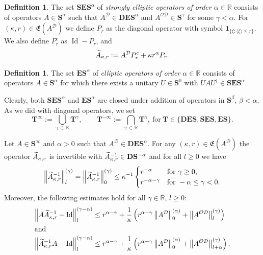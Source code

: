 \documentclass[10pt]{amsart}
\theoremstyle{definition}\newtheorem{defi}[theo]{Definition}\newtheorem{rema}[theo]{Remark}\newtheorem{exam}[theo]{Example}\newtheorem{nota}[theo]{Notation}
\DeclareMathOperator{\Id}{Id}
\newcommand{\R}{\mathbb R}
\newcommand{\CD}{\mathcal{D}}
\newcommand{\CO}{\mathcal{O}}
\newcommand{\bone}{\boldsymbol 1}
\newcommand{\BD}{\mathbf D}
\newcommand{\BE}{\mathbf E}
\newcommand{\BS}{\mathbf S}
\newcommand{\BT}{\mathbf T}
\newcommand{\FE}{\mathfrak{E}}
\newcommand{\snorm}[3]{\left\| #1\right\|_{#3}^{(#2)}}
\newcommand{\ang}[1]{\langle #1 \rangle}
\newcommand{\er}{r}
\let\oldtilde\tilde
\renewcommand*{\tilde}[1]{\mathchoice{\widetilde{#1}}{\widetilde{#1}}{\oldtilde{#1}}{\oldtilde{#1}}}
\begin{document}
\begin{defi}\label{def:ES}
The set $\BS\BE\BS^\alpha$ of \emph{strongly elliptic operators of order $\alpha\in\R$} consists of operators $A\in\BS^\alpha$ such that $A^\CD \in \BD\BE\BS^\alpha$ and $A^{\CO\CD} \in
\BS^\gamma$ for some $\gamma < \alpha$. For $(\kappa,\er)\in \FE(A^\CD)$ we define $P_\er$ as the diagonal operator with symbol $\bone_{\{\xi: \ang{\xi}\leq
\er\}}$. We also define $P_\er^c$ as $\Id - P_\er$, and
\begin{equation}\label{eq:tilde A}
\tilde A_{\kappa,\er} := A^\CD P_\er^c + \kappa \er^\alpha P_\er.
\end{equation}
\end{defi}

\begin{defi}\label{def:WES}
The set $\BE\BS^\alpha$ of \emph{elliptic operators of order $\alpha\in\R$} consists of operators $A\in\BS^\alpha$ for which there exists a unitary $U\in\BS^0$ with $U A U^\dagger\in\BS\BE\BS^\alpha$.
\end{defi}

Clearly, both $\BS\BE\BS^\alpha$ and $\BE\BS^\alpha$ are closed under addition of operators in $\BS^\beta$, $\beta < \alpha$. As we did with diagonal operators, we set
\begin{equation}
\BT^\infty:=\bigcup\limits_{\gamma\,\in\,\R}\BT^\gamma, \qquad \BT^{-\infty}:=\bigcap\limits_{\gamma\,\in\,\R}\BT^\gamma, \ \text{for} \ \BT\in \lbrace \BD\BE\BS, \BS\BE\BS, \BE\BS \rbrace.
\end{equation}

\begin{prop}\label{prop:globell}
Let $A\in\BS^\infty$ and $\alpha >0$ such that $A^{\CD}\in\BD\BE\BS^\alpha$. For any $(\kappa, \er)\in\FE(A^\CD)$ the operator $\tilde A_{\kappa,\er}$ is invertible with $\tilde A_{\kappa,\er}^{-1}\in\BD\BS^{-\alpha}$ and for all $l \ge 0$ we have
\begin{equation}\label{eq:globinvsnorm}
\snorm{\tilde A_{\kappa,\er}^{-1}}{\gamma}{l} =\snorm{\tilde A_{\kappa,\er}^{-1}}{\gamma}{0} \leq \kappa^{-1}
\begin{cases}
\er^{-\alpha} &\text{for } \gamma \geq 0,\\ \er^{-\alpha -\gamma} &\text{for }-\alpha \leq
\gamma < 0.
\end{cases}
\end{equation}
Moreover, the following estimates hold for all $\gamma \in\R$, $l\geq 0$:
\begin{align}
\snorm{A \tilde A_{\kappa,\er}^{-1} - \Id}{\gamma - \alpha}{l} &\le
\er^{\alpha -\gamma} + \frac 1 \kappa \left(
\er^{\alpha - \gamma} \snorm{A^\CD}{\alpha}{0} +
\snorm{A^{\CO\CD}}{\gamma}{l}
\right)\label{eq:AA_R -Id}
\\
\intertext{and}
\snorm{\tilde A_{\kappa,\er}^{-1} A - \Id}{\gamma - \alpha}{l} &\le
\er^{\alpha -\gamma} + \frac 1 \kappa \left(
\er^{\alpha - \gamma} \snorm{A^\CD}{\alpha}{0} +
\snorm{A^{\CO\CD}}{\gamma}{l+\alpha}
\right).\label{eq:A_RA -Id}
\end{align}
\end{prop}
\end{document}
